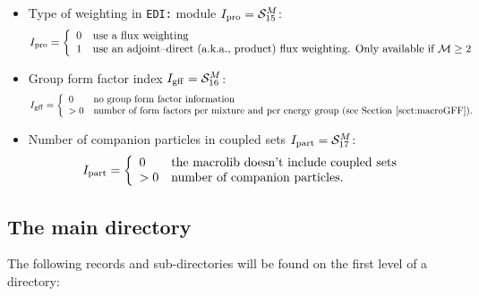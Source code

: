 \begin{itemize}
\begin{displaymath}
\end{displaymath}
\item Type of weighting in {\tt EDI:} module $I_{\rm pro}=\mathcal{S}^{M}_{15}$:
\begin{displaymath}
I_{\rm pro} = \left\{
\begin{array}{ll}
0 & \textrm{use a flux weighting}\\
1 & \textrm{use an adjoint--direct (a.k.a., product) flux weighting. Only available if $\mathcal{M}\ge 2$}
\end{array} \right.
\end{displaymath}
\item Group form factor index $I_{\rm gff}=\mathcal{S}^{M}_{16}$:
\begin{displaymath}
I_{\rm gff} = \left\{
\begin{array}{ll}
0 & \textrm{no group form factor information}\\
>0 & \textrm{number of form factors per mixture and per energy group (see \Sect{macroGFF}).}
\end{array} \right.
\end{displaymath}
\item Number of companion particles in coupled sets $I_{\rm part}=\mathcal{S}^{M}_{17}$:
\begin{displaymath}
I_{\rm part} = \left\{
\begin{array}{ll}
0 & \textrm{the macrolib doesn't include coupled sets}\\
>0 & \textrm{number of companion particles.}
\end{array} \right.
\end{displaymath}
\end{itemize}

\subsection{The main  directory}\label{sect:macrolibdirmain}

The following records and sub-directories will be found on the first level of a 
directory:


